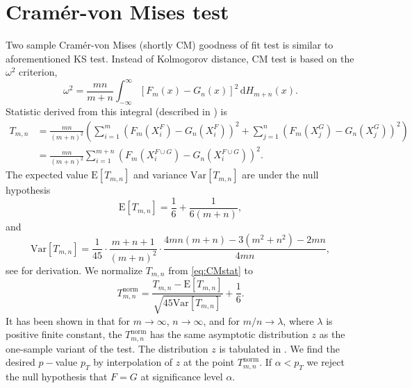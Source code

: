 \section{Cram\'{e}r-von Mises test}
Two sample Cram\'{e}r-von Mises (shortly CM) goodness of fit test is similar to aforementioned KS test. Instead of Kolmogorov distance, CM test  is based on the $\omega^2$ criterion,
\begin{equation}
\omega^2 = \frac{mn}{m+n} \int_{-\infty}^\infty \left[F_m(x) - G_n(x) \right]^2 \,\mathrm{d} H_{m+n}(x).
\end{equation} 
Statistic derived from this integral (described in \cite{Anderson1962}) is
\begin{align}
T_{m,n} & = \frac{mn}{(m+n)^2}\left( \sum_{i=1}^m \left( F_m\left(X^F_i\right) - G_n\left(X^F_i\right)\right)^2 + \sum_{j=1}^n \left( F_m\left(X^G_j\right) - G_n\left(X^G_j\right)\right)^2 \right) \\
& = \frac{mn}{(m+n)^2} \sum_{i=1}^{m+n} \left( F_m\left(X^{F\cup G}_i\right) - G_n\left(X^{F\cup G}_i\right)\right)^2 .
\label{eq:CMstat} %
\end{align}
The expected value $\mathrm{E} [T_{m,n}]$ and variance $\mathrm{Var} [T_{m,n}]$ are %
under the null hypothesis 
\begin{equation}
\mathrm{E} [T_{m,n}] = \frac{1}{6} + \frac{1}{6(m+n)},
\end{equation}
and
\begin{equation}
\mathrm{Var} [T_{m,n}] = \frac{1}{45} \cdot \frac{m+n+1}{(m+n)^2} \cdot \frac{4mn(m+n) - 3(m^2 + n^2)-2mn}{4mn},
\end{equation}
see \cite{Anderson1962} for derivation. We normalize $T_{m,n}$ from \eqref{eq:CMstat} to
\begin{equation}
T_{m,n}^\mathrm{norm} = \frac{T_{m,n}-\mathrm{E}[T_{m,n}]}{\sqrt{45\mathrm{Var}[T_{m,n}]}} + \frac{1}{6}.
\end{equation}
It has been shown in \cite{Rosenblatt1952} that for $m \rightarrow \infty$, $n \rightarrow \infty$, and for ${m}/{n} \rightarrow \lambda$, where $\lambda$ is positive finite constant, the  $T_{m,n}^\mathrm{norm}$ has the same asymptotic distribution $z$ as the one-sample variant of the test. The distribution $z$ is tabulated  in \cite{AndersonDarling1952}. We find the desired $p-$value $p_T$ by interpolation of $z$ at the point $T_{m,n}^\mathrm{norm}$. If $\alpha < p_T$ we reject the null hypothesis that $F = G $ at significance level $\alpha$.

